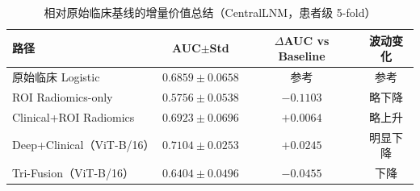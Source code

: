 \begin{table}[H]
\centering
\caption{相对原始临床基线的增量价值总结（CentralLNM，患者级 5-fold）}
\label{tab:incremental_value}
\small
\begin{tabular}{lccc}
\toprule
路径 & AUC$\pm$Std & $\Delta$AUC vs Baseline & 波动变化 \\
\midrule
原始临床 Logistic & $0.6859\pm0.0658$ & 参考 & 参考 \\
ROI Radiomics-only & $0.5756\pm0.0538$ & $-0.1103$ & 略下降 \\
Clinical+ROI Radiomics & $0.6923\pm0.0696$ & $+0.0064$ & 略上升 \\
Deep+Clinical（ViT-B/16） & $\mathbf{0.7104\pm0.0253}$ & $\mathbf{+0.0245}$ & 明显下降 \\
Tri-Fusion（ViT-B/16） & $0.6404\pm0.0496$ & $-0.0455$ & 下降 \\
\bottomrule
\end{tabular}
\end{table}
